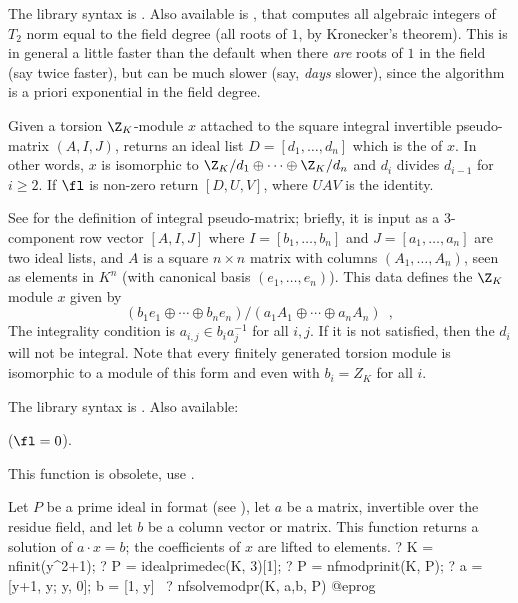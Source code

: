 The library syntax is .
Also available is , that computes
all algebraic integers of $T_2$ norm equal to the field degree
(all roots of $1$, by Kronecker's theorem). This is in general a little
faster than the default when there \emph{are} roots of $1$ in the field
(say twice faster), but can be much slower (say, \emph{days} slower), since
the algorithm is a priori exponential in the field degree.

\label{se:nfsnf}
Given a torsion $\Z_K$-module $x$ attached to the square integral
invertible pseudo-matrix $(A,I,J)$, returns an ideal list
$D=[d_1,\dots,d_n]$ which is the  of $x$. In other
words, $x$ is isomorphic to $\Z_K/d_1\oplus\cdots\oplus\Z_K/d_n$ and $d_i$
divides $d_{i-1}$ for $i\ge2$. If $\fl$ is non-zero return $[D,U,V]$, where
$UAV$ is the identity.

See  for the definition of integral pseudo-matrix;
briefly, it is input as a 3-component row vector $[A,I,J]$ where
$I = [b_1,\dots,b_n]$ and $J = [a_1,\dots,a_n]$ are two ideal lists,
and $A$ is a square $n\times n$ matrix with columns $(A_1,\dots,A_n)$,
seen as elements in $K^n$ (with canonical basis $(e_1,\dots,e_n)$).
This data defines the $\Z_K$ module $x$ given by
$$ (b_1e_1\oplus\cdots\oplus b_ne_n) / (a_1A_1\oplus\cdots\oplus a_nA_n)
\enspace, $$
The integrality condition is $a_{i,j} \in b_i a_j^{-1}$ for all $i,j$. If it
is not satisfied, then the $d_i$ will not be integral. Note that every
finitely generated torsion module is isomorphic to a module of this form and
even with $b_i=Z_K$ for all $i$.

The library syntax is .
Also available:

 ($\fl = 0$).

\label{se:nfsolvemodpr}
This function is obsolete, use .

Let $P$ be a prime ideal in  format (see ),
let $a$ be a matrix, invertible over the residue field, and let $b$ be
a column vector or matrix. This function returns a solution of $a\cdot x =
b$; the coefficients of $x$ are lifted to  elements.
\bprog
? K = nfinit(y^2+1);
? P = idealprimedec(K, 3)[1];
? P = nfmodprinit(K, P);
? a = [y+1, y; y, 0]; b = [1, y]~
? nfsolvemodpr(K, a,b, P)
@eprog

